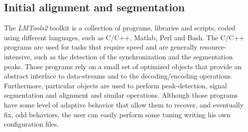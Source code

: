 \subsection{Initial alignment and segmentation}
%
%

The \emph{LMTools2} toolkit is a collection of programs, libraries and
scripts, coded using different languages, such as C/C++, Matlab, Perl and Bash.
The C/C++ programs are used for tasks that require speed and are generally
resource-intensive, such as the detection of the synchronization and the
segmentation peaks. 
Those programs rely on a small set of optimized objects that provide an
abstract interface to data-streams and to the decoding/encoding operations.
Furthermore, particular objects are used to perform peak-detection, signal
segmentation and alignment and similar operations.
Although those programs have some level of adaptive behavior that allow them
to recover, and eventually fix, odd behaviors, the user can easily perform
some tuning writing his own configuration files.

